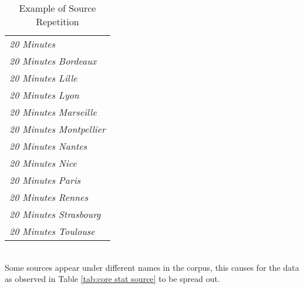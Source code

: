 \begin{table}[H]
\caption{Example of Source Repetition}
\label{tab:source repetition}
\centering
\begin{tabular}{l}
\toprule
\emph{20 Minutes} \\
\emph{20 Minutes Bordeaux} \\
\emph{20 Minutes Lille} \\
\emph{20 Minutes Lyon} \\
\emph{20 Minutes Marseille} \\
\emph{20 Minutes Montpellier} \\
\emph{20 Minutes Nantes} \\
\emph{20 Minutes Nice} \\
\emph{20 Minutes Paris} \\
\emph{20 Minutes Rennes} \\
\emph{20 Minutes Strasbourg} \\
\emph{20 Minutes Toulouse} \\
\bottomrule
\end{tabular} \\[0.2cm]
Some sources appear under different names in the corpus, this causes for the data as observed in Table \ref{tab:core stat source} to be spread out.
\end{table}

